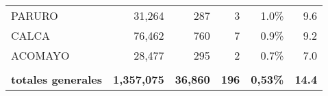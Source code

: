 \begin{tabular}{lrrrrr}
	\cellcolor[HTML]{FFFFC7}PARURO        & 31,264                                                         & 287                                                                             & 3                                                              & 1.0\%                                                                  & 9.6                                                                                                                                \\
	\cellcolor[HTML]{FFFFC7}CALCA         & 76,462                                                         & 760                                                                             & 7                                                              & 0.9\%                                                                  & 9.2                                                                                                                                \\
	\cellcolor[HTML]{FFFFC7}ACOMAYO       & 28,477                                                         & 295                                                                             & 2                                                              & 0.7\%                                                                  & 7.0                                                                                                                                \\
	&                                                                &                                                                                 &                                                                &                                                                        &                                                                                                                                    \\
	\rowcolor[HTML]{ECF4FF} 
	\textbf{totales generales}            & \textbf{1,357,075}                                             & \textbf{36,860}                                                                 & \textbf{196}                                                   & \textbf{0,53\%}                                                        & \textbf{14.4}                                                                                                                     
\end{tabular}